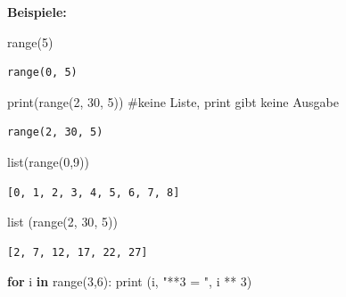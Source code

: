 \documentclass[
  11pt,
  a4paper,
  DIV=11,
  numbers=noendperiod]{scrartcl}
\newenvironment{Shaded}{\begin{snugshade}}{\end{snugshade}}
\newcommand{\BuiltInTok}[1]{\textcolor[rgb]{0.00,0.23,0.31}{#1}}
\newcommand{\CommentTok}[1]{\textcolor[rgb]{0.37,0.37,0.37}{#1}}
\newcommand{\ControlFlowTok}[1]{\textcolor[rgb]{0.00,0.23,0.31}{\textbf{#1}}}
\newcommand{\DecValTok}[1]{\textcolor[rgb]{0.68,0.00,0.00}{#1}}
\newcommand{\KeywordTok}[1]{\textcolor[rgb]{0.00,0.23,0.31}{\textbf{#1}}}
\newcommand{\NormalTok}[1]{\textcolor[rgb]{0.00,0.23,0.31}{#1}}
\newcommand{\OperatorTok}[1]{\textcolor[rgb]{0.37,0.37,0.37}{#1}}
\newcommand{\StringTok}[1]{\textcolor[rgb]{0.13,0.47,0.30}{#1}}
\begin{document}
\textbf{Beispiele:}

\begin{Shaded}
\begin{Highlighting}[numbers=left,,]
\BuiltInTok{range}\NormalTok{(}\DecValTok{5}\NormalTok{)}
\end{Highlighting}
\end{Shaded}

\begin{verbatim}
range(0, 5)
\end{verbatim}

\begin{Shaded}
\begin{Highlighting}[numbers=left,,]
\BuiltInTok{print}\NormalTok{(}\BuiltInTok{range}\NormalTok{(}\DecValTok{2}\NormalTok{, }\DecValTok{30}\NormalTok{, }\DecValTok{5}\NormalTok{)) }\CommentTok{\#keine Liste, print gibt keine Ausgabe}
\end{Highlighting}
\end{Shaded}

\begin{verbatim}
range(2, 30, 5)
\end{verbatim}

\begin{Shaded}
\begin{Highlighting}[numbers=left,,]
\BuiltInTok{list}\NormalTok{(}\BuiltInTok{range}\NormalTok{(}\DecValTok{0}\NormalTok{,}\DecValTok{9}\NormalTok{))}
\end{Highlighting}
\end{Shaded}

\begin{verbatim}
[0, 1, 2, 3, 4, 5, 6, 7, 8]
\end{verbatim}

\begin{Shaded}
\begin{Highlighting}[numbers=left,,]
\BuiltInTok{list}\NormalTok{ (}\BuiltInTok{range}\NormalTok{(}\DecValTok{2}\NormalTok{, }\DecValTok{30}\NormalTok{, }\DecValTok{5}\NormalTok{))}
\end{Highlighting}
\end{Shaded}

\begin{verbatim}
[2, 7, 12, 17, 22, 27]
\end{verbatim}

\begin{Shaded}
\begin{Highlighting}[numbers=left,,]
\ControlFlowTok{for}\NormalTok{ i }\KeywordTok{in} \BuiltInTok{range}\NormalTok{(}\DecValTok{3}\NormalTok{,}\DecValTok{6}\NormalTok{):}
    \BuiltInTok{print}\NormalTok{ (i, }\StringTok{"**3 = "}\NormalTok{, i }\OperatorTok{**} \DecValTok{3}\NormalTok{)}
\end{Highlighting}
\end{Shaded}
\end{document}
